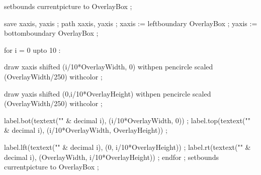 
\ifconditional \simpleslidesHighlight
  \ifconditional \simpleslidesGrid
  \fi
  \ifconditional \simpleslidesSubGrid
  \fi
 \ifcase \simpleslidesHighlightAlternative \or
   \or
    \or
    \fi
  \fi
  setbounds currentpicture to OverlayBox ;
\stopuseMPgraphic


  save xaxis, yaxis ; path xaxis, yaxis ;
  xaxis := leftboundary OverlayBox ;
  yaxis := bottomboundary OverlayBox ;


  for i = 0 upto 10 :

    draw xaxis shifted (i/10*OverlayWidth, 0) 
               withpen pencircle scaled (OverlayWidth/250) 
               withcolor \MPcolor\simpleslidesGridColor ;

    draw yaxis shifted (0,i/10*OverlayHeight) 
               withpen pencircle scaled (OverlayWidth/250) 
               withcolor \MPcolor\simpleslidesGridColor ;

    label.bot(textext("\ix {}" & decimal i),
              (i/10*OverlayWidth, 0)) ;
    label.top(textext("\ix {}" & decimal i),
              (i/10*OverlayWidth, OverlayHeight)) ;

    label.lft(textext("\ix {}" & decimal i),
              (0, i/10*OverlayHeight)) ;
    label.rt(textext("\ix {}" & decimal i),
              (OverlayWidth, i/10*OverlayHeight)) ;
  endfor ;
  setbounds currentpicture to OverlayBox ;
\stopuseMPgraphic


